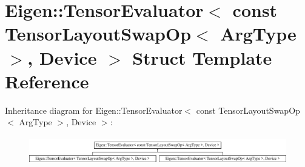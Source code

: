 \hypertarget{struct_eigen_1_1_tensor_evaluator_3_01const_01_tensor_layout_swap_op_3_01_arg_type_01_4_00_01_device_01_4}{}\section{Eigen\+:\+:Tensor\+Evaluator$<$ const Tensor\+Layout\+Swap\+Op$<$ Arg\+Type $>$, Device $>$ Struct Template Reference}
\label{struct_eigen_1_1_tensor_evaluator_3_01const_01_tensor_layout_swap_op_3_01_arg_type_01_4_00_01_device_01_4}
Inheritance diagram for Eigen\+:\+:Tensor\+Evaluator$<$ const Tensor\+Layout\+Swap\+Op$<$ Arg\+Type $>$, Device $>$\+:\begin{figure}[H]
\begin{center}
\leavevmode
\includegraphics[height=1.225383cm]{struct_eigen_1_1_tensor_evaluator_3_01const_01_tensor_layout_swap_op_3_01_arg_type_01_4_00_01_device_01_4}
\end{center}
\end{figure}
